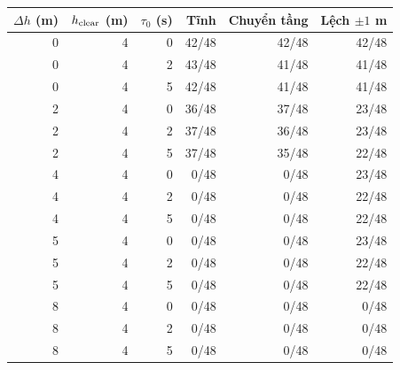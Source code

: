 \begin{tabular}{rrrrrr}
\toprule
$\Delta h$ (m) & $h_{\rm clear}$ (m) & $\tau_0$ (s) & Tĩnh & Chuyển tầng & Lệch $\pm1$ m \\
\midrule
0 & 4 & 0 & 42/48 & 42/48 & 42/48 \\
0 & 4 & 2 & 43/48 & 41/48 & 41/48 \\
0 & 4 & 5 & 42/48 & 41/48 & 41/48 \\
2 & 4 & 0 & 36/48 & 37/48 & 23/48 \\
2 & 4 & 2 & 37/48 & 36/48 & 23/48 \\
2 & 4 & 5 & 37/48 & 35/48 & 22/48 \\
4 & 4 & 0 & 0/48 & 0/48 & 23/48 \\
4 & 4 & 2 & 0/48 & 0/48 & 22/48 \\
4 & 4 & 5 & 0/48 & 0/48 & 22/48 \\
5 & 4 & 0 & 0/48 & 0/48 & 23/48 \\
5 & 4 & 2 & 0/48 & 0/48 & 22/48 \\
5 & 4 & 5 & 0/48 & 0/48 & 22/48 \\
8 & 4 & 0 & 0/48 & 0/48 & 0/48 \\
8 & 4 & 2 & 0/48 & 0/48 & 0/48 \\
8 & 4 & 5 & 0/48 & 0/48 & 0/48 \\
\bottomrule
\end{tabular}
